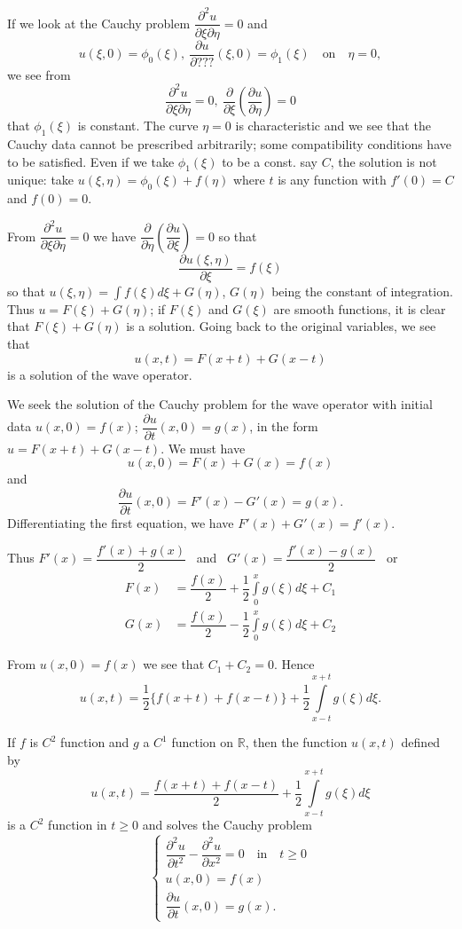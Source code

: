 If we look at the Cauchy problem $\dfrac{\partial^{2}u}{\partial\xi\partial\eta}=0$ and
$$
u(\xi,0)=\phi_{0}(\xi), \ \dfrac{\partial u}{\partial ???}(\xi,0)=\phi_{1}(\xi)\quad\text{on}\quad \eta=0,
$$
we see from
$$
\dfrac{\partial^{2}u}{\partial \xi \partial \eta}=0, \ \dfrac{\partial}{\partial \xi}\left(\dfrac{\partial u}{\partial \eta}\right)=0
$$
that $\phi_{1}(\xi)$ is constant. The curve $\eta=0$ is characteristic and we see that the Cauchy data cannot be prescribed arbitrarily; some compatibility conditions have to be satisfied. Even if we take $\phi_{1}(\xi)$ to be a const. say $C$, the solution is not unique: take $u(\xi,\eta)=\phi_{0}(\xi)+f(\eta)$ where $t$ is any function with $f'(0)=C$ and $f(0)=0$.

From $\dfrac{\partial^{2}u}{\partial \xi\partial\eta}=0$ we have $\dfrac{\partial}{\partial\eta}\left(\dfrac{\partial u}{\partial\xi}\right)=0$ so that
$$
\frac{\partial u(\xi,\eta)}{\partial \xi}=f(\xi)
$$
so that $u(\xi,\eta)=\int f(\xi)d\xi+G(\eta)$, $G(\eta)$ being the constant of integration. Thus $u=F(\xi)+G(\eta)$; if $F(\xi)$ and $G(\xi)$ are smooth functions, it is clear that $F(\xi)+G(\eta)$ is a solution. Going back to the original variables, we see that
$$
u(x,t)=F(x+t)+G(x-t)
$$
is a solution of the wave operator.

We seek the solution of the Cauchy problem for the wave operator with initial data $u(x,0)=f(x)$; $\dfrac{\partial u}{\partial t}(x,0)=g(x)$, in the form $u=F(x+t)+G(x-t)$. We must have 
$$
u(x,0)=F(x)+G(x)=f(x)
$$\pageoriginale
and
$$
\frac{\partial u}{\partial t}(x,0)=F'(x)-G'(x)=g(x).
$$
Differentiating the first equation, we have $F'(x)+G'(x)=f'(x)$.

\smallskip

Thus $F'(x)=\dfrac{f'(x)+g(x)}{2}$  \ and \ $G'(x)=\dfrac{f'(x)-g(x)}{2}$ \ or
\begin{align*}
F(x) &= \dfrac{f(x)}{2}+\dfrac{1}{2}\int\limits^{x}_{0}g(\xi)d\xi+C_{1}\\[3pt]
G(x) &= \dfrac{f(x)}{2}-\dfrac{1}{2}\int\limits^{x}_{0}g(\xi)d\xi+C_{2}
\end{align*}

From $u(x,0)=f(x)$ we see that $C_{1}+C_{2}=0$. Hence
$$
u(x,t)=\dfrac{1}{2}\{f(x+t)+f(x-t)\}+\frac{1}{2}\int\limits^{x+t}_{x-t}g(\xi)d\xi.
$$

\begin{theorem*}
If $f$ is $C^{2}$ function and $g$ a $C^{1}$ function on $\mathbb{R}$, then the function $u(x,t)$ defined by
$$
u(x,t)=\dfrac{f(x+t)+f(x-t)}{2}+\dfrac{1}{2}\int\limits^{x+t}_{x-t}g(\xi)d\xi
$$
is a $C^{2}$ function in $t\geq 0$ and solves the Cauchy problem
$$
\begin{cases}
\dfrac{\partial^{2}u}{\partial t^{2}}-\dfrac{\partial^{2}u}{\partial x^{2}}=0\quad\text{in}\quad t\geq 0\\[5pt]
u(x,0)=f(x)\\[3pt]
\dfrac{\partial u}{\partial t}(x,0)=g(x).
\end{cases}
$$
\end{theorem*}


